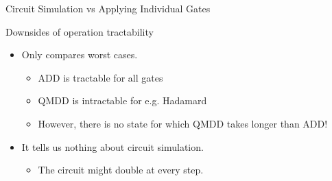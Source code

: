 \begin{frame}{Circuit Simulation vs Applying Individual Gates}


\begin{alertblock}{Downsides of operation tractability}
	\begin{itemize}
	\item<+-> Only compares worst cases.
	\begin{itemize}
	\item ADD is tractable for all gates
	\item QMDD is intractable for e.g. Hadamard
	\item However, there is no state for which QMDD takes longer than ADD!
	\end{itemize}
	\item<+-> It tells us nothing about circuit simulation.
\begin{itemize}
	\item The circuit might double at every step.
\end{itemize}
	\end{itemize}
\end{alertblock}


\end{frame}
